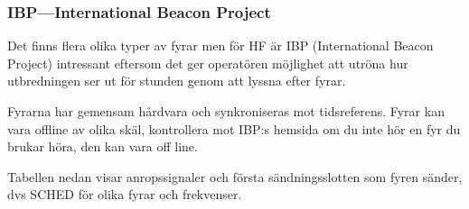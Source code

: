 \subsubsection{IBP---International Beacon Project}

Det finns flera olika typer av fyrar men för HF är IBP (International Beacon Project) intressant eftersom det ger operatören möjlighet att utröna hur utbredningen ser ut för stunden genom att lyssna efter fyrar. 

Fyrarna har gemensam hårdvara och synkroniseras mot tidsreferens. Fyrar kan vara offline av olika skäl, kontrollera mot IBP:s hemsida om du inte hör en fyr du brukar höra, den kan vara off line.

Tabellen nedan visar anropssignaler och första sändningsslotten som fyren sänder, dvs SCHED för olika fyrar och frekvenser.

